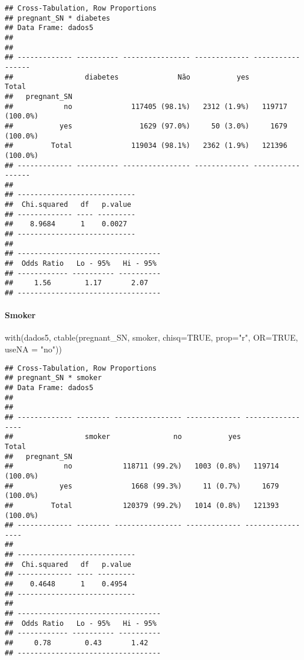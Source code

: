 \documentclass[
]{article}
\newenvironment{Shaded}{\begin{snugshade}}{\end{snugshade}}
\newcommand{\AttributeTok}[1]{\textcolor[rgb]{0.77,0.63,0.00}{#1}}
\newcommand{\ConstantTok}[1]{\textcolor[rgb]{0.00,0.00,0.00}{#1}}
\newcommand{\FunctionTok}[1]{\textcolor[rgb]{0.00,0.00,0.00}{#1}}
\newcommand{\NormalTok}[1]{#1}
\newcommand{\StringTok}[1]{\textcolor[rgb]{0.31,0.60,0.02}{#1}}
\begin{document}
\begin{verbatim}
## Cross-Tabulation, Row Proportions  
## pregnant_SN * diabetes  
## Data Frame: dados5  
## 
## 
## ------------- ---------- ---------------- ------------- -----------------
##                 diabetes              Não           yes             Total
##   pregnant_SN                                                            
##            no              117405 (98.1%)   2312 (1.9%)   119717 (100.0%)
##           yes                1629 (97.0%)     50 (3.0%)     1679 (100.0%)
##         Total              119034 (98.1%)   2362 (1.9%)   121396 (100.0%)
## ------------- ---------- ---------------- ------------- -----------------
## 
## ----------------------------
##  Chi.squared   df   p.value 
## ------------- ---- ---------
##    8.9684      1    0.0027  
## ----------------------------
## 
## ----------------------------------
##  Odds Ratio   Lo - 95%   Hi - 95% 
## ------------ ---------- ----------
##     1.56        1.17       2.07   
## ----------------------------------
\end{verbatim}

\hypertarget{smoker}{%
\paragraph{\texorpdfstring{{ Smoker }}{ Smoker }}\label{smoker}}

\begin{Shaded}
\begin{Highlighting}[]
\FunctionTok{with}\NormalTok{(dados5, }\FunctionTok{ctable}\NormalTok{(pregnant\_SN, smoker, }\AttributeTok{chisq=}\ConstantTok{TRUE}\NormalTok{, }\AttributeTok{prop=}\StringTok{"r"}\NormalTok{, }\AttributeTok{OR=}\ConstantTok{TRUE}\NormalTok{, }\AttributeTok{useNA =} \StringTok{"no"}\NormalTok{))}
\end{Highlighting}
\end{Shaded}

\begin{verbatim}
## Cross-Tabulation, Row Proportions  
## pregnant_SN * smoker  
## Data Frame: dados5  
## 
## 
## ------------- -------- ---------------- ------------- -----------------
##                 smoker               no           yes             Total
##   pregnant_SN                                                          
##            no            118711 (99.2%)   1003 (0.8%)   119714 (100.0%)
##           yes              1668 (99.3%)     11 (0.7%)     1679 (100.0%)
##         Total            120379 (99.2%)   1014 (0.8%)   121393 (100.0%)
## ------------- -------- ---------------- ------------- -----------------
## 
## ----------------------------
##  Chi.squared   df   p.value 
## ------------- ---- ---------
##    0.4648      1    0.4954  
## ----------------------------
## 
## ----------------------------------
##  Odds Ratio   Lo - 95%   Hi - 95% 
## ------------ ---------- ----------
##     0.78        0.43       1.42   
## ----------------------------------
\end{verbatim}
\end{document}
